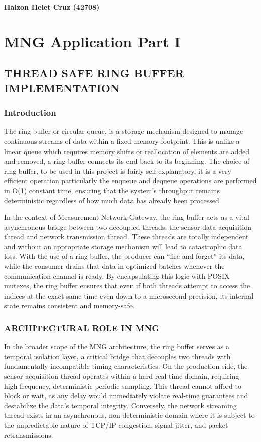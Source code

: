\clearpage 
\null 
\vfill 
\begin{center}
\textbf{\large Haizon Helet Cruz (42708)}
\end{center}
\vfill 
{}
\clearpage


\chapter{MNG Application Part I}
\section{THREAD SAFE RING BUFFER IMPLEMENTATION}
\subsection{Introduction}
The ring buffer or circular queue, is a storage mechanism designed to manage continuous streams of data within a fixed-memory footprint. This is unlike a linear queue which requires memory shifts or reallocation of elements are added and removed, a ring buffer connects its end back to its beginning. The choice of ring buffer, to be used in this project is fairly self explanatory, it is a very efficient operation particularly the enqueue and dequeue operations are performed in O(1) constant time, ensuring that the system’s throughput remains deterministic regardless of how much data has already been processed. 

In the context of Measurement Network Gateway, the ring buffer acts as a vital asynchronous bridge between two decoupled threads: the sensor data acquisition thread and network transmission thread. These threads are totally independent and without an appropriate storage mechanism will lead to catastrophic data loss. With the use of a ring buffer, the producer can “fire and forget” its data, while the consumer drains that data in optimized batches whenever the communication channel is ready. By encapsulating this logic with POSIX mutexes, the ring buffer ensures that even if both threads attempt to access the indices at the exact same time even down to a microsecond precision, its internal state remains consistent and memory-safe.

\subsection{ARCHITECTURAL ROLE IN MNG}
In the broader scope of the MNG architecture, the ring buffer serves as a temporal isolation layer, a critical bridge that decouples two threads with fundamentally incompatible timing characteristics. On the production side, the sensor acquisition thread operates within a hard real-time domain, requiring high-frequency, deterministic periodic sampling. This thread cannot afford to block or wait, as any delay would immediately violate real-time guarantees and destabilize the data’s temporal integrity. Conversely, the network streaming thread exists in an asynchronous, non-deterministic domain where it is subject to the unpredictable nature of TCP/IP congestion, signal jitter, and packet retransmissions.

